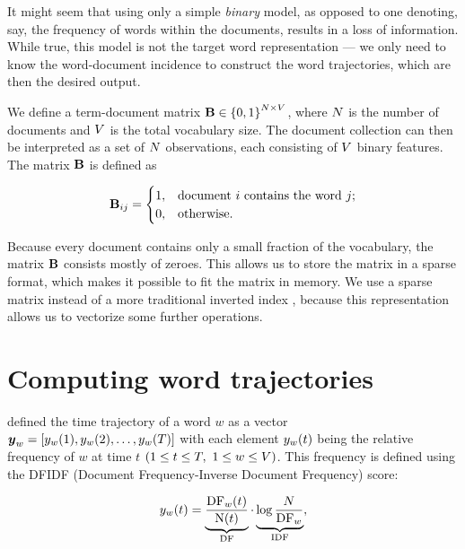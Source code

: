 It might seem that using only a simple \textit{binary} model, as opposed to one denoting, say, the frequency of words within the documents, results in a loss of information. While true, this model is not the target word representation --- we only need to know the word-document incidence to construct the word trajectories, which are then the desired output.

We define a term-document matrix $\mathbf{B} \in \left\{ 0, 1 \right\}^{N \times V}$, where $N$ is the number of documents and $V$ is the total vocabulary size. The document collection can then be interpreted as a set of $N$ observations, each consisting of $V$ binary features. The matrix $\mathbf{B}$ is defined as

\begin{equation} \label{eq:bow-matrix}
	\mathbf{B}_{ij} =
	\begin{cases}
		1, & \text{document}~i~\text{contains the word}~j \text{;} \\
		0, & \text{otherwise.}
	\end{cases}
\end{equation}

Because every document contains only a small fraction of the vocabulary, the matrix $\mathbf{B}$ consists mostly of zeroes. This allows us to store the matrix in a sparse format, which makes it possible to fit the matrix in memory. We use a sparse matrix instead of a more traditional inverted index \citep{information-retrieval}, because this representation allows us to vectorize some further operations.


\section{Computing word trajectories}
\cite{event-detection} defined the time trajectory of a word $w$ as a vector\\ $\vect{\traj}_{w} = \left[ \traj_{w}(1), \traj_{w}(2), \dots, \traj_{w}(\streamlen) \right]$ with each element $y_{w}(t)$ being the relative frequency of $w$ at time $t$ $(1 \leq t \leq T,\ 1 \leq w \leq V)$. This frequency is defined using the DFIDF (Document Frequency-Inverse Document Frequency) score:

\begin{equation}
	y_{w}(t) = \underbrace{\frac{\text{DF}_{w}(t)}{\text{N}(t)}}_{\text{DF}} \cdot \underbrace{\log{\frac{N}{\text{DF}_{w}}}}_{\text{IDF}},
\end{equation}

